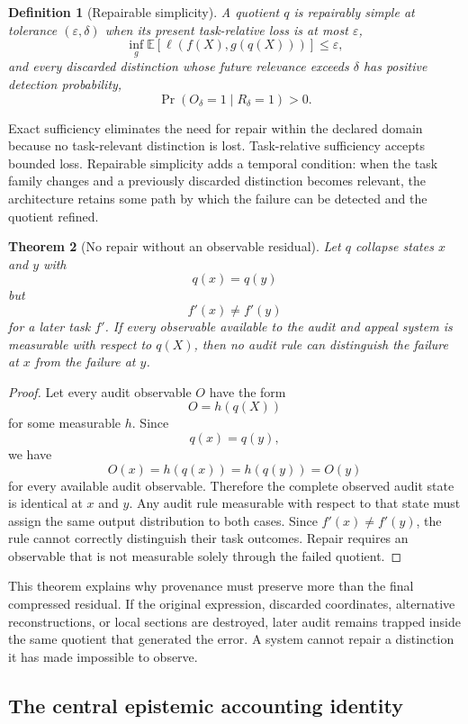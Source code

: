 \documentclass[11pt]{article}
\newtheorem{definition}{Definition}[section]
\newtheorem{theorem}[definition]{Theorem}
\theoremstyle{definition}
\DeclareMathOperator{\Prob}{Pr}
\newcommand{\E}{\mathbb{E}}
\newcommand{\eps}{\varepsilon}
\begin{document}
\begin{definition}[Repairable simplicity]
A quotient \(q\) is repairably simple at tolerance \((\eps,\delta)\) when its present task-relative loss is at most \(\eps\),
\[
\inf_g
\E[
\ell(f(X),g(q(X)))
]
\leq\eps,
\]
and every discarded distinction whose future relevance exceeds \(\delta\) has positive detection probability,
\[
\Prob(O_\delta=1\mid R_\delta=1)>0.
\]
\end{definition}

Exact sufficiency eliminates the need for repair within the declared domain because no task-relevant distinction is lost. Task-relative sufficiency accepts bounded loss. Repairable simplicity adds a temporal condition: when the task family changes and a previously discarded distinction becomes relevant, the architecture retains some path by which the failure can be detected and the quotient refined.

\begin{theorem}[No repair without an observable residual]
Let \(q\) collapse states \(x\) and \(y\) with
\[
q(x)=q(y)
\]
but
\[
f'(x)\neq f'(y)
\]
for a later task \(f'\). If every observable available to the audit and appeal system is measurable with respect to \(q(X)\), then no audit rule can distinguish the failure at \(x\) from the failure at \(y\).
\end{theorem}

\begin{proof}
Let every audit observable \(O\) have the form
\[
O=h(q(X))
\]
for some measurable \(h\). Since
\[
q(x)=q(y),
\]
we have
\[
O(x)=h(q(x))=h(q(y))=O(y)
\]
for every available audit observable. Therefore the complete observed audit state is identical at \(x\) and \(y\). Any audit rule measurable with respect to that state must assign the same output distribution to both cases. Since \(f'(x)\neq f'(y)\), the rule cannot correctly distinguish their task outcomes. Repair requires an observable that is not measurable solely through the failed quotient.
\end{proof}

This theorem explains why provenance must preserve more than the final compressed residual. If the original expression, discarded coordinates, alternative reconstructions, or local sections are destroyed, later audit remains trapped inside the same quotient that generated the error. A system cannot repair a distinction it has made impossible to observe.

\subsection{The central epistemic accounting identity}
\end{document}
